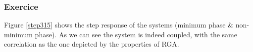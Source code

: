 \subsubsection{Exercice}

Figure \ref{step315} shows the step response of the systems (minimum phase \& non-minimum phase). 
As we can see the system is indeed coupled, with the same correlation as the one depicted by the properties of RGA.

